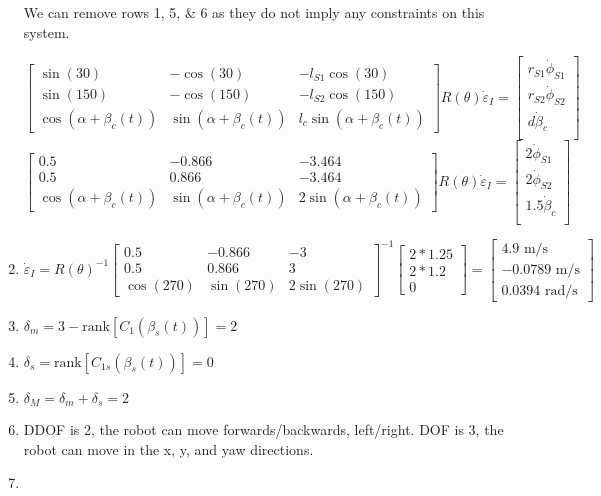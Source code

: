 \documentclass[12pt]{article}
\begin{document}
\begin{enumerate}
	We can remove rows 1, 5, \& 6 as they do not imply any constraints on this system.
	
	\[
		\begin{bmatrix}
			\sin(30) & -\cos(30) & -l_{S1}\cos(30) \\
			\sin(150) & -\cos(150) & -l_{S2}\cos(150) \\
			\cos(\alpha + \beta_c(t)) & \sin(\alpha + \beta_c(t)) & l_c \sin(\alpha + \beta_c(t))
		\end{bmatrix} R(\theta) \dot{\varepsilon}_I = \begin{bmatrix}
			r_{S1} \dot{\phi}_{S1} \\
			r_{S2} \dot{\phi}_{S2} \\
			d\dot{\beta}_c \\
		\end{bmatrix}
	\]
	\[
		\begin{bmatrix}
			0.5 & -0.866 & -3.464 \\
			0.5 & 0.866 & -3.464 \\
			\cos(\alpha + \beta_c(t)) & \sin(\alpha + \beta_c(t)) & 2\sin(\alpha + \beta_c(t))
		\end{bmatrix} R(\theta) \dot{\varepsilon}_I = \begin{bmatrix}
			2 \dot{\phi}_{S1} \\
			2 \dot{\phi}_{S2} \\
			1.5 \dot{\beta}_c \\
		\end{bmatrix}
	\]
	
	\item $
		\dot{\varepsilon}_I = R(\theta)^{-1} \begin{bmatrix}
			0.5 & -0.866 & -3 \\
			0.5 & 0.866 & 3 \\
			\cos(270) & \sin(270) & 2\sin(270)
		\end{bmatrix}^{-1} \begin{bmatrix}
			2*1.25 \\
			2*1.2 \\
			0
		\end{bmatrix} = \begin{bmatrix}
			4.9 \text{ m/s} \\
			-0.0789 \text{ m/s} \\
			0.0394 \text{ rad/s}
		\end{bmatrix}
	$
	
	\item $\delta_m = 3 - \text{rank}[C_1(\beta_s(t))] = 2$
	\item $\delta_s = \text{rank}[C_{1s}(\beta_s(t))] = 0$
	\item $\delta_M = \delta_m + \delta_s = 2$
	\item DDOF is 2, the robot can move forwards/backwards, left/right. DOF is 3, the robot can move in the x, y, and yaw directions.
	\item
	\end{enumerate}
\end{document}
